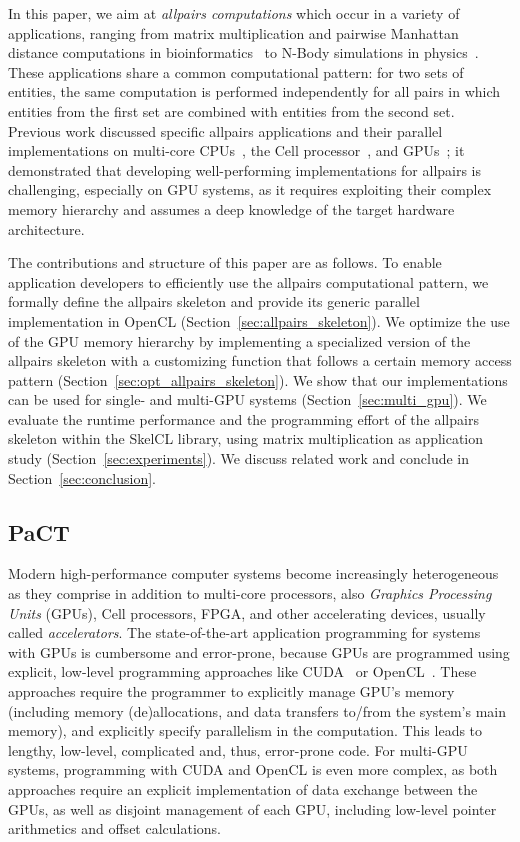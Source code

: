 In this paper, we aim at \emph{allpairs computations} which occur in a variety of applications, ranging from matrix multiplication and pairwise Manhattan distance computations in bioinformatics~\cite{DaDQR-09} to N-Body simulations in physics~\cite{ArSV-09}.
These applications share a common computational pattern:
for two sets of entities, the same computation is performed independently for all pairs in which entities from the first set are combined with entities from the second set.
Previous work discussed specific allpairs applications and their parallel implementations on multi-core CPUs~\cite{ArSV-09}, the Cell processor~\cite{WiSK-09}, and GPUs~\cite{DaDQR-09,SaA-13};
it demonstrated that developing well-performing implementations for allpairs is challenging, especially on GPU systems, as it requires exploiting their complex memory hierarchy and assumes a deep knowledge of the target hardware architecture.

The contributions and structure of this paper are as follows.
To enable application developers to efficiently use the allpairs computational pattern, we formally define the allpairs skeleton and provide its generic parallel implementation in OpenCL (Section~\ref{sec:allpairs_skeleton}).
We optimize the use of the GPU memory hierarchy by implementing a specialized version of the allpairs skeleton with a customizing function that follows a certain memory access pattern (Section~\ref{sec:opt_allpairs_skeleton}).
We show that our implementations can be used for single- and multi-GPU systems (Section~\ref{sec:multi_gpu}).
We evaluate the runtime performance and the programming effort of the allpairs skeleton within the SkelCL library, using matrix multiplication as application study (Section~\ref{sec:experiments}).
We discuss related work and conclude in Section~\ref{sec:conclusion}.

\subsection{PaCT}
Modern high-performance computer systems become increasingly heterogeneous as they comprise in addition to multi-core processors, also \emph{Graphics Processing Units} (GPUs), Cell processors, FPGA, and other accelerating devices, usually called \emph{accelerators}.
The state-of-the-art application programming for systems with GPUs is cumbersome and error-prone, because GPUs are programmed using explicit, low-level programming approaches like CUDA~\cite{CUDA-11} or OpenCL~\cite{OpenCL-10}.
These approaches require the programmer to explicitly manage GPU's memory (including memory (de)allocations, and data transfers to/from the system's main memory), and explicitly specify parallelism in the computation.
This leads to lengthy, low-level, complicated and, thus, error-prone code.
For multi-GPU systems, programming with CUDA and OpenCL is even more complex, as both approaches require an explicit implementation of data exchange between the GPUs, as well as disjoint management of each GPU, including low-level pointer arithmetics and offset calculations.

